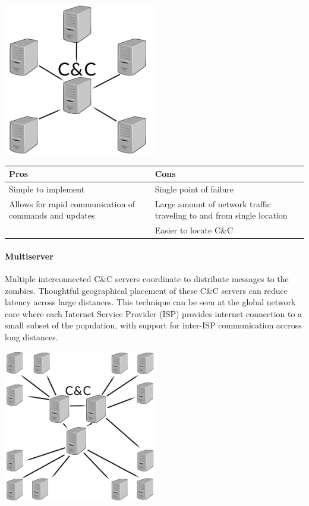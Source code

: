 \begin{center}
  \includegraphics[width=0.5\textwidth]{assets/startopo.png}
  \label{fig:star_topo_fig}
\end{center}

\begin{tabular}{p{8cm} | p{8cm}}
  \textbf{Pros} & \textbf{Cons} \\ \hline
  \textbullet{}Simple to implement                                    & \textbullet{}Single point of failure \\
  \textbullet{}Allows for rapid communication of commands and updates & \textbullet{}Large amount of network traffic traveling to and from single location\\
                                                                      & \textbullet{}Easier to locate C\&C
\end{tabular}

\paragraph{Multiserver \cite{topology}}
Multiple interconnected C\&C servers coordinate to distribute messages to the zombies.
Thoughtful geographical placement of these C\&C servers can reduce latency across
large distances.  This technique can be seen at the global network core where each
Internet Service Provider (ISP) provides internet connection to a small subset of the population, with support for
inter-ISP communication accross long distances.

\begin{center}
  \includegraphics[width=0.5\textwidth]{assets/multiservertopo.png}
  \label{fig:mulitserver_topo_fig}
\end{center}

